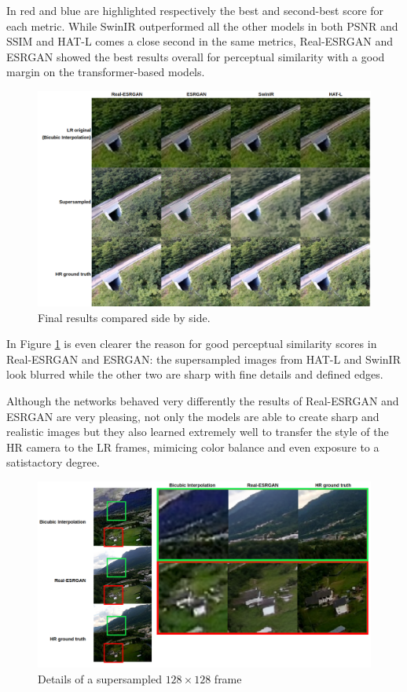 In red and blue are highlighted respectively the best and second-best score for each metric. While SwinIR outperformed all the other models in both PSNR and SSIM and HAT-L comes a close second in the same metrics, Real-ESRGAN and ESRGAN showed the best results overall for perceptual similarity with a good margin on the transformer-based models.


\begin{figure}[H]

  \includegraphics[scale=0.4]{figures/results/comp_table.png}
  \caption{Final results compared side by side.}
  \label{img:comp_table}
\end{figure}

In Figure \ref{img:comp_table} is even clearer the reason for good perceptual similarity scores in Real-ESRGAN and ESRGAN: the supersampled images from HAT-L and SwinIR look blurred while the other two are sharp with fine details and defined edges.

Although the networks behaved very differently the results of Real-ESRGAN and ESRGAN are very pleasing, not only the models are able to create sharp and realistic images but they also learned extremely well to transfer the style of the HR camera to the LR frames, mimicing color balance and even exposure to a satistactory degree.

\begin{figure}[H]
  \includegraphics[scale=0.3]{figures/results/realesrgan128_example_table.png}
  \caption{Details of a supersampled \(128\times128\) frame}
  \label{img:example_table}
\end{figure}

